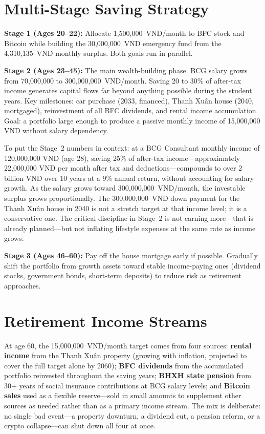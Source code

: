 \section{Multi-Stage Saving Strategy}

\textbf{Stage 1 (Ages 20--22):} Allocate 1,500,000~VND/month to BFC stock and Bitcoin while building the 30,000,000~VND emergency fund from the 4,310,135~VND monthly surplus. Both goals run in parallel.

\textbf{Stage 2 (Ages 23--45):} The main wealth-building phase. BCG salary grows from 70,000,000 to 300,000,000~VND/month. Saving 20 to 30\% of after-tax income generates capital flows far beyond anything possible during the student years. Key milestones: car purchase (2033, financed), Thanh Xuân house (2040, mortgaged), reinvestment of all BFC dividends, and rental income accumulation. Goal: a portfolio large enough to produce a passive monthly income of 15,000,000 VND without salary dependency.

To put the Stage~2 numbers in context: at a BCG Consultant monthly income of 120,000,000 VND (age 28), saving 25\% of after-tax income---approximately 22,000,000 VND per month after tax and deductions---compounds to over 2 billion VND over 10 years at a 9\% annual return, without accounting for salary growth. As the salary grows toward 300,000,000~VND/month, the investable surplus grows proportionally. The 300,000,000~VND down payment for the Thanh Xuân house in 2040 is not a stretch target at that income level; it is a conservative one. The critical discipline in Stage~2 is not earning more---that is already planned---but not inflating lifestyle expenses at the same rate as income grows.

\textbf{Stage 3 (Ages 46--60):} Pay off the house mortgage early if possible. Gradually shift the portfolio from growth assets toward stable income-paying ones (dividend stocks, government bonds, short-term deposits) to reduce risk as retirement approaches.

\section{Retirement Income Streams}

At age 60, the 15,000,000~VND/month target comes from four sources: \textbf{rental income} from the Thanh Xuân property (growing with inflation, projected to cover the full target alone by 2060); \textbf{BFC dividends} from the accumulated portfolio reinvested throughout the saving years; \textbf{BHXH state pension} from 30+ years of social insurance contributions at BCG salary levels; and \textbf{Bitcoin sales} used as a flexible reserve---sold in small amounts to supplement other sources as needed rather than as a primary income stream. The mix is deliberate: no single bad event---a property downturn, a dividend cut, a pension reform, or a crypto collapse---can shut down all four at once.
